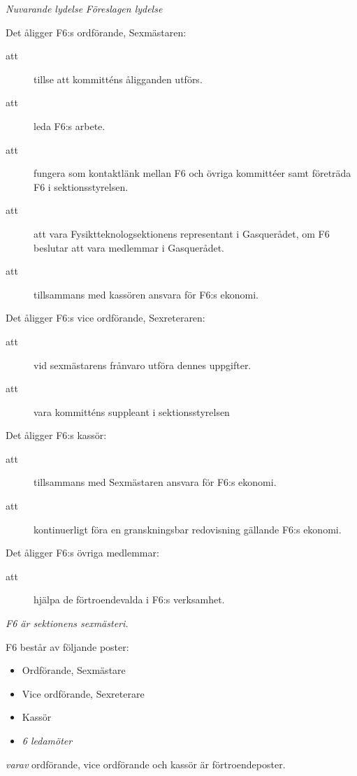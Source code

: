 \documentclass{article}
\newenvironment{lydelse}
    {\begin{paracol}{2}%
        \emph{Nuvarande lydelse}%
        \switchcolumn%
        \emph{Föreslagen lydelse}%
    \end{paracol}%
    \begin{enumerate}[label=\thesubsection.\arabic*]%
    \begin{paracol}{2}%
    }{\end{paracol}\end{enumerate}}
\begin{document}
\begin{lydelse}
	\item Det åligger F6:s ordförande, Sexmästaren:
	\begin{description}
		\item[att] tillse att kommitténs åligganden utförs.
		\item[att] leda F6:s arbete.
		\item[att] fungera som kontaktlänk mellan F6 och övriga kommittéer samt företräda F6 i sektionsstyrelsen.
		\item[att] att vara Fysiktteknologsektionens representant i Gasquerådet, om F6 beslutar att vara medlemmar i Gasquerådet.
		\item[att] tillsammans med kassören ansvara för F6:s ekonomi.
	\end{description}
	
	\item Det åligger F6:s vice ordförande, Sexreteraren:
	\begin{description}
		\item[att] vid sexmästarens frånvaro utföra dennes uppgifter.
		\item[att] vara kommitténs suppleant i sektionsstyrelsen
	\end{description}

    \item Det åligger F6:s kassör:
	\begin{description}
		\item[att] tillsammans med Sexmästaren ansvara för F6:s ekonomi.
		\item[att] kontinuerligt föra en granskningsbar redovisning gällande F6:s ekonomi.
	\end{description}

    \item Det åligger F6:s övriga medlemmar:
	\begin{description}
		\item[att] hjälpa de förtroendevalda i F6:s verksamhet.
	\end{description}

    \setcounter{section}{5}
    \setcounter{subsection}{5}

    \switchcolumn

    \item \emph{F6 är sektionens sexmästeri.}

    \item F6 består av följande poster:
    \begin{itemize}
    	\item Ordförande, Sexmästare
    	\item Vice ordförande, Sexreterare
    	\item Kassör
    	\item \emph{6 ledamöter}
    \end{itemize}
    \emph{varav} ordförande, vice ordförande och kassör är förtroendeposter.
    

\end{lydelse}
\end{document}
